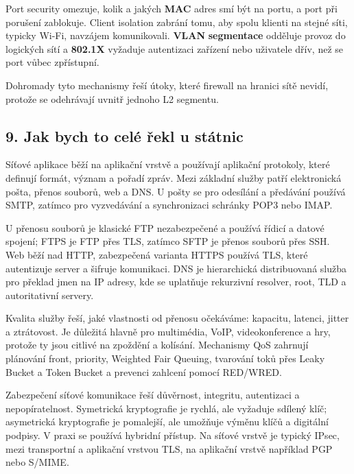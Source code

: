 Port security omezuje, kolik a jakých \textbf{MAC} adres smí být na portu, a port při porušení zablokuje. Client isolation zabrání tomu, aby spolu klienti na stejné síti, typicky Wi-Fi, navzájem komunikovali. \textbf{VLAN} \textbf{segmentace} odděluje provoz do logických sítí a \textbf{802.1X} vyžaduje autentizaci zařízení nebo uživatele dřív, než se port vůbec zpřístupní.

Dohromady tyto mechanismy řeší útoky, které firewall na hranici sítě nevidí, protože se odehrávají uvnitř jednoho L2 segmentu.


\subsection*{9. Jak bych to celé řekl u státnic}

Síťové aplikace běží na aplikační vrstvě a používají aplikační protokoly, které definují formát, význam a pořadí zpráv. Mezi základní služby patří elektronická pošta, přenos souborů, web a DNS. U pošty se pro odesílání a předávání používá SMTP, zatímco pro vyzvedávání a synchronizaci schránky POP3 nebo IMAP.

U přenosu souborů je klasické FTP nezabezpečené a používá řídicí a datové spojení; FTPS je FTP přes TLS, zatímco SFTP je přenos souborů přes SSH. Web běží nad HTTP, zabezpečená varianta HTTPS používá TLS, které autentizuje server a šifruje komunikaci. DNS je hierarchická distribuovaná služba pro překlad jmen na IP adresy, kde se uplatňuje rekurzivní resolver, root, TLD a autoritativní servery.

Kvalita služby řeší, jaké vlastnosti od přenosu očekáváme: kapacitu, latenci, jitter a ztrátovost. Je důležitá hlavně pro multimédia, VoIP, videokonference a hry, protože ty jsou citlivé na zpoždění a kolísání. Mechanismy QoS zahrnují plánování front, priority, Weighted Fair Queuing, tvarování toků přes Leaky Bucket a Token Bucket a prevenci zahlcení pomocí RED/WRED.

Zabezpečení síťové komunikace řeší důvěrnost, integritu, autentizaci a nepopíratelnost. Symetrická kryptografie je rychlá, ale vyžaduje sdílený klíč; asymetrická kryptografie je pomalejší, ale umožňuje výměnu klíčů a digitální podpisy. V praxi se používá hybridní přístup. Na síťové vrstvě je typický IPsec, mezi transportní a aplikační vrstvou TLS, na aplikační vrstvě například PGP nebo S/MIME.

